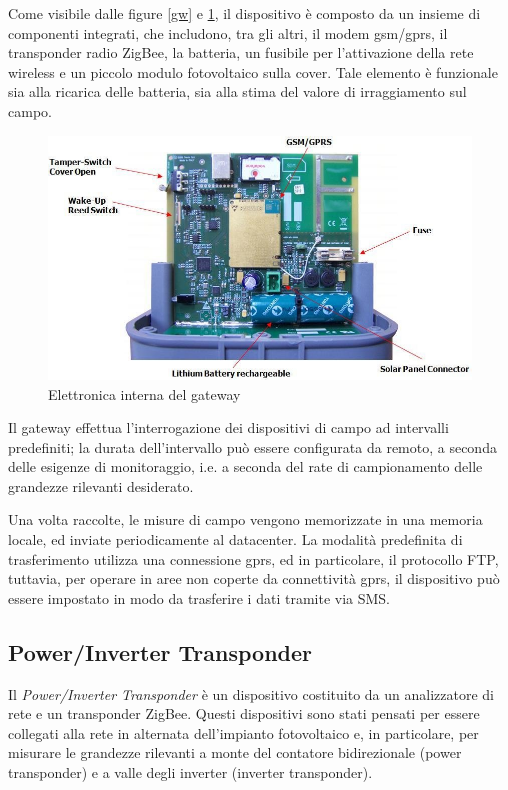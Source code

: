 %
Come visibile dalle figure \ref{gw} e \ref{gw-opened}, il dispositivo \`e composto 
da un insieme di componenti integrati, che includono, tra gli altri,   il 
modem gsm/gprs,  il transponder radio ZigBee,  la batteria, 
 un fusibile per l'attivazione della rete wireless e  un 
piccolo modulo fotovoltaico sulla cover.
%
Tale elemento \`e funzionale sia alla ricarica delle batteria, sia alla stima
del valore di irraggiamento sul campo.
%
\begin{figure}[!h]
\centering
\includegraphics[width=350pt]{img/gw-opened.jpg}
\caption{Elettronica interna del gateway}
\label{gw-opened}
\end{figure}
%

%
Il gateway effettua l'interrogazione dei dispositivi di campo ad intervalli 
predefiniti; la durata dell'intervallo pu\`o essere configurata da remoto, a seconda 
delle esigenze di monitoraggio, i.e. a seconda del rate di campionamento
delle grandezze rilevanti desiderato.
%

%
Una volta raccolte, le misure di campo vengono memorizzate in una memoria locale, 
ed inviate periodicamente al datacenter.
%
La modalit\`a predefinita di trasferimento utilizza una connessione gprs, ed
in particolare, il protocollo FTP, tuttavia, per operare in aree non coperte da 
connettivit\`a gprs, il dispositivo pu\`o essere impostato in modo da trasferire 
i dati tramite via SMS.
%

%
\subsection{Power/Inverter Transponder}
%
Il \emph{Power/Inverter Transponder} \`e un dispositivo costituito da  un 
analizzatore di rete e  un transponder ZigBee.
%
Questi dispositivi sono stati pensati per essere collegati alla rete in alternata 
dell'impianto fotovoltaico e, in particolare, per misurare le grandezze rilevanti 
a monte del contatore bidirezionale (power transponder) e a valle degli inverter 
(inverter transponder).
%

